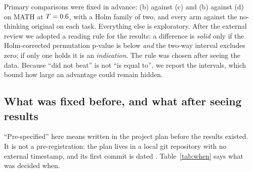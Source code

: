 \documentclass[11pt]{article}
\begin{document}
Primary comparisons were fixed in advance: (b) against (c) and (b) against (d) on MATH at $T=0.6$, with a Holm family of two, and every arm against the no-thinking original on each task. Everything else is exploratory. After the external review we adopted a reading rule for the results: a difference is \emph{solid} only if the Holm-corrected permutation p-value is below \HolmAlpha{} \emph{and} the two-way interval excludes zero; if only one holds it is an \emph{indication}. The rule was chosen after seeing the data. Because ``did not beat'' is not ``is equal to'', we report the intervals, which bound how large an advantage could remain hidden.

\subsection{What was fixed before, and what after seeing results}\label{sec:3.7}

``Pre-specified'' here means written in the project plan before the results existed. It is not a pre-registration: the plan lives in a local git repository with no external timestamp, and its first commit is dated \DateFirstCommit{}. Table~\ref{tab:when} says what was decided when.
\end{document}
